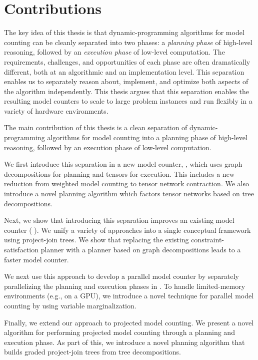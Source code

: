 \section{Contributions}
The key idea of this thesis is that dynamic-programming algorithms for model counting can be cleanly separated into two phases: a \emph{planning phase} of high-level reasoning, followed by an \emph{execution phase} of low-level computation. 
The requirements, challenges, and opportunities of each phase are often dramatically different, both at an algorithmic and an implementation level.  
This separation enables us to separately reason about, implement, and optimize both aspects of the algorithm independently.
This thesis argues that this separation enables the resulting model counters to scale to large problem instances and run flexibly in a variety of hardware environments.

The main contribution of this thesis is a clean separation of dynamic-programming algorithms for model counting into a planning phase of high-level reasoning, followed by an execution phase of low-level computation.

We first introduce this separation in a new model counter, , which uses graph decompositions for planning and tensors for execution. This includes a new reduction from weighted model counting to tensor network contraction. We also introduce a novel planning algorithm which factors tensor networks based on tree decompositions.

Next, we show that introducing this separation improves an existing model counter ( \cite{DPV20}). We unify a variety of approaches into a single conceptual framework using project-join trees. We show that replacing the existing constraint-satisfaction planner with a planner based on graph decompositions leads to a faster model counter.

We next use this approach to develop a parallel model counter by separately parallelizing the planning and execution phases in . To handle limited-memory environments (e.g., on a GPU), we introduce a novel technique for parallel model counting by using variable marginalization.

Finally, we extend our approach to projected model counting. We present a novel algorithm for performing projected model counting through a planning and execution phase. As part of this, we introduce a novel planning algorithm that builds graded project-join trees from tree decompositions.

